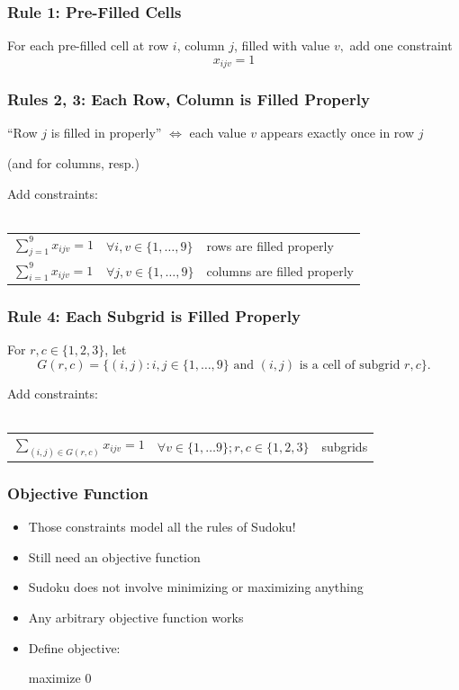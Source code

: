 \documentclass{beamer}
\newcommand{\stanza}{ \\~\ }
\begin{document}
\begin{frame} \frametitle{Rule 1: Pre-Filled Cells}

  For each pre-filled cell at row $i$, column $j$, filled with value $v,$ add one constraint
  \[ x_{ijv} =1 \]

\end{frame}

\begin{frame} \frametitle{Rules 2, 3: Each Row, Column is Filled Properly}

\begin{center}
  ``Row $j$ is filled in properly'' $\Leftrightarrow$ each value $v$ appears exactly once in row $j$

  (and for columns, resp.)
\end{center}

Add constraints:
\stanza

  \begin{tabular}{lll}
    $\sum_{j=1}^9 x_{ijv} = 1$ & $\forall i, v \in \{1, \ldots, 9\}$ & rows are filled properly \\
    $\sum_{i=1}^9 x_{ijv} = 1$ & $\forall j, v \in \{1, \ldots, 9\}$ & columns are filled properly
  \end{tabular}
\end{frame}

\begin{frame} \frametitle{Rule 4: Each Subgrid is Filled Properly}

  For $r, c \in \{1, 2, 3\}$, let
  \[ G(r, c) = \{
  (i, j) : i, j \in \{1, \ldots, 9\}
  \text{ and } (i, j)
  \text{ is a cell of subgrid } r, c
  \} . \]

  Add constraints:
  \stanza
  \begin{tabular}{lll}
    $\sum_{(i, j) \in G(r, c)} x_{ijv} = 1$ & $\forall v \in \{1, \ldots 9\}; r,c \in \{1, 2, 3\}$ & subgrids
  \end{tabular}
  
\end{frame}

\begin{frame} \frametitle{Objective Function}
  \begin{itemize}
    \item Those constraints model all the rules of Sudoku!
    \item Still need an objective function
    \item Sudoku does not involve minimizing or maximizing anything
    \item Any arbitrary objective function works
    \item Define objective:

      maximize 0

  \end{itemize}
\end{frame}
\end{document}
